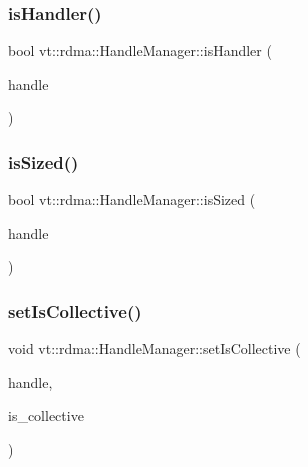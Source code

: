 \subsubsection{\texorpdfstring{is\+Handler()}{isHandler()}}
{\footnotesize\ttfamily bool vt\+::rdma\+::\+Handle\+Manager\+::is\+Handler (\begin{DoxyParamCaption}\item[{\hyperlink{structvt_1_1rdma_1_1_handle_manager_acebfe9aa5887a015cc5da18f4f7e55ae}{R\+D\+M\+A\+\_\+\+Universal\+Id\+Type} const \&}]{handle }\end{DoxyParamCaption})\hspace{0.3cm}{\ttfamily [static]}}

\mbox{\label{structvt_1_1rdma_1_1_handle_manager_ab39b12a946cd70fdc18033167187d9a8}} 
\subsubsection{\texorpdfstring{is\+Sized()}{isSized()}}
{\footnotesize\ttfamily bool vt\+::rdma\+::\+Handle\+Manager\+::is\+Sized (\begin{DoxyParamCaption}\item[{\hyperlink{structvt_1_1rdma_1_1_handle_manager_acebfe9aa5887a015cc5da18f4f7e55ae}{R\+D\+M\+A\+\_\+\+Universal\+Id\+Type} const \&}]{handle }\end{DoxyParamCaption})\hspace{0.3cm}{\ttfamily [static]}}

\mbox{\label{structvt_1_1rdma_1_1_handle_manager_a81e715ef00f47433e44f77b210729b4e}} 
\subsubsection{\texorpdfstring{set\+Is\+Collective()}{setIsCollective()}}
{\footnotesize\ttfamily void vt\+::rdma\+::\+Handle\+Manager\+::set\+Is\+Collective (\begin{DoxyParamCaption}\item[{\hyperlink{structvt_1_1rdma_1_1_handle_manager_acebfe9aa5887a015cc5da18f4f7e55ae}{R\+D\+M\+A\+\_\+\+Universal\+Id\+Type} \&}]{handle,  }\item[{bool const \&}]{is\+\_\+collective }\end{DoxyParamCaption})\hspace{0.3cm}{\ttfamily [static]}}

